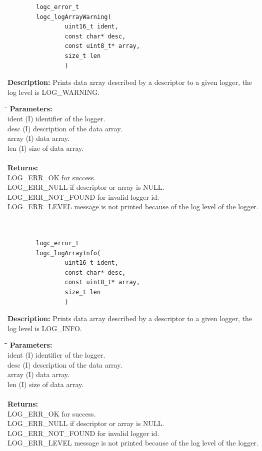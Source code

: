 \documentclass[a4paper, titlepage, 11pt]{article}
\begin{document}
\small
\begin{verbatim}
        logc_error_t
        logc_logArrayWarning(
                uint16_t ident,
                const char* desc,
                const uint8_t* array,
                size_t len
                )
\end{verbatim}
\normalsize
\textbf{Description:} Prints data array described by a descriptor to a given logger, the log level is LOG\_WARNING.
\begin{tabbing}
\hspace*{1cm}\=\hspace*{2cm}\=\hspace*{0,6cm}\= \kill
\textbf{Parameters:} \\
\> ident \> (I) identifier of the logger. \\
\> desc \> (I) description of the data array. \\
\> array \> (I) data array. \\
\> len \> (I) size of data array. \\ \\
\textbf{Returns:} \\
\> LOG\_ERR\_OK for success. \\
\> LOG\_ERR\_NULL if descriptor or array is NULL. \\
\> LOG\_ERR\_NOT\_FOUND for invalid logger id. \\
\> LOG\_ERR\_LEVEL message is not printed because of the log level of the logger.  \\ \\ \\
\end{tabbing}

\small
\begin{verbatim}
        logc_error_t
        logc_logArrayInfo(
                uint16_t ident,
                const char* desc,
                const uint8_t* array,
                size_t len
                )
\end{verbatim}
\normalsize
\textbf{Description:} Prints data array described by a descriptor to a given logger, the log level is LOG\_INFO.
\begin{tabbing}
\hspace*{1cm}\=\hspace*{2cm}\=\hspace*{0,6cm}\= \kill
\textbf{Parameters:} \\
\> ident \> (I) identifier of the logger. \\
\> desc \> (I) description of the data array. \\
\> array \> (I) data array. \\
\> len \> (I) size of data array. \\ \\
\textbf{Returns:} \\
\> LOG\_ERR\_OK for success. \\
\> LOG\_ERR\_NULL if descriptor or array is NULL. \\
\> LOG\_ERR\_NOT\_FOUND for invalid logger id. \\
\> LOG\_ERR\_LEVEL message is not printed because of the log level of the logger. \\
\end{tabbing}
\end{document}

